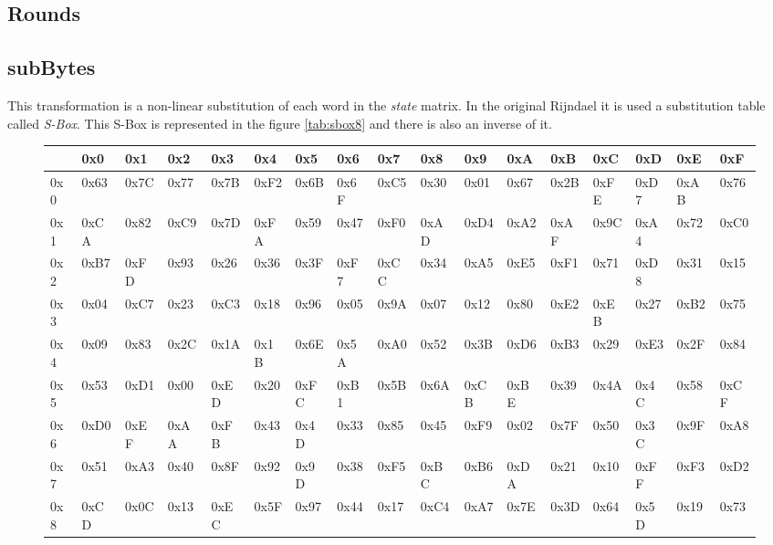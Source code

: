 \documentclass[a4paper,twoside]{llncs}
\begin{document}
\subsection{Rounds}

\subsection{subBytes}
This transformation is a non-linear substitution of each word in the \emph{state} matrix. In the original Rijndael it is used a substitution table called \emph{S-Box}. This S-Box is represented in the figure \ref{tab:sbox8} and there is also an inverse of it.

\begin{figure}[b]{\tiny
\begin{center}
\begin{tabular}[]{|l||l|l|l|l|l|l|l|l|l|l|l|l|l|l|l|l|}\hline
    & 0x0  & 0x1  & 0x2  & 0x3  & 0x4  & 0x5  & 0x6  & 0x7  & 0x8  & 0x9  & 0xA  & 0xB  & 0xC  & 0xD  & 0xE  & 0xF \\\hline\hline
0x0 & 0x63 & 0x7C & 0x77 & 0x7B & 0xF2 & 0x6B & 0x6F & 0xC5 & 0x30 & 0x01 & 0x67 & 0x2B & 0xFE & 0xD7 & 0xAB & 0x76\\\hline
0x1 & 0xCA & 0x82 & 0xC9 & 0x7D & 0xFA & 0x59 & 0x47 & 0xF0 & 0xAD & 0xD4 & 0xA2 & 0xAF & 0x9C & 0xA4 & 0x72 & 0xC0 \\\hline
0x2 & 0xB7 & 0xFD & 0x93 & 0x26 & 0x36 & 0x3F & 0xF7 & 0xCC & 0x34 & 0xA5 & 0xE5 & 0xF1 & 0x71 & 0xD8 & 0x31 & 0x15 \\\hline
0x3 & 0x04 & 0xC7 & 0x23 & 0xC3 & 0x18 & 0x96 & 0x05 & 0x9A & 0x07 & 0x12 & 0x80 & 0xE2 & 0xEB & 0x27 & 0xB2 & 0x75 \\\hline
0x4 & 0x09 & 0x83 & 0x2C & 0x1A & 0x1B & 0x6E & 0x5A & 0xA0 & 0x52 & 0x3B & 0xD6 & 0xB3 & 0x29 & 0xE3 & 0x2F & 0x84 \\\hline
0x5 & 0x53 & 0xD1 & 0x00 & 0xED & 0x20 & 0xFC & 0xB1 & 0x5B & 0x6A & 0xCB & 0xBE & 0x39 & 0x4A & 0x4C & 0x58 & 0xCF \\\hline
0x6 & 0xD0 & 0xEF & 0xAA & 0xFB & 0x43 & 0x4D & 0x33 & 0x85 & 0x45 & 0xF9 & 0x02 & 0x7F & 0x50 & 0x3C & 0x9F & 0xA8 \\\hline
0x7 & 0x51 & 0xA3 & 0x40 & 0x8F & 0x92 & 0x9D & 0x38 & 0xF5 & 0xBC & 0xB6 & 0xDA & 0x21 & 0x10 & 0xFF & 0xF3 & 0xD2 \\\hline
0x8 & 0xCD & 0x0C & 0x13 & 0xEC & 0x5F & 0x97 & 0x44 & 0x17 & 0xC4 & 0xA7 & 0x7E & 0x3D & 0x64 & 0x5D & 0x19 & 0x73 \\\hline

\end{tabular}
\end{center}}
\end{figure}
\end{document}

